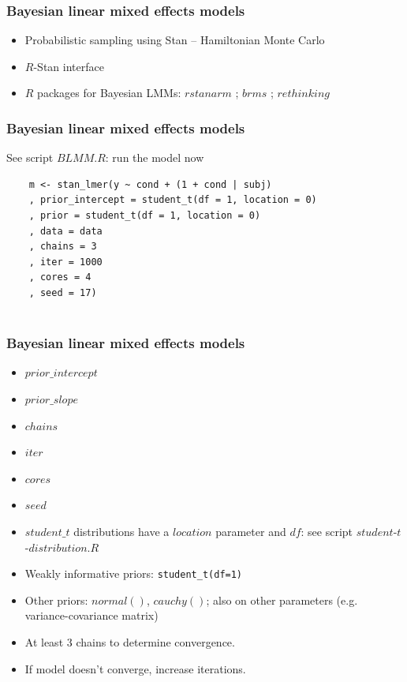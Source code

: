 \begin{frame}
	\frametitle{Bayesian linear mixed effects models}
	
	\begin{itemize}
		\item Probabilistic sampling using Stan -- Hamiltonian Monte Carlo
		\item $R$-Stan interface \cite{rstan2}
		\item $R$ packages for Bayesian LMMs: $rstanarm$ \cite{rstanarm}; $brms$ \cite{brms}; $rethinking$ \cite{mcelreath2016statistical}
	\end{itemize}
	
\end{frame}




\begin{frame}[fragile]
	\frametitle{Bayesian linear mixed effects models}

	See script $BLMM.R$: run the model now
	
	\begin{verbatim}
	m <- stan_lmer(y ~ cond + (1 + cond | subj)
	, prior_intercept = student_t(df = 1, location = 0) 
	, prior = student_t(df = 1, location = 0)
	, data = data
	, chains = 3
	, iter = 1000
	, cores = 4
	, seed = 17) 
		
	\end{verbatim}

\end{frame}


\begin{frame}
	\frametitle{Bayesian linear mixed effects models}

\begin{minipage}{3cm}
	\begin{itemize}
		\item $prior\_intercept$
		\item $prior\_slope$
		\item $chains$
		\item $iter$
		\item $cores$
		\item $seed$
	\end{itemize}
\end{minipage}
\hfill
\begin{minipage}{7.5cm}
	\begin{itemize}
		\item $student\_t$ distributions have a $location$ parameter and $df$: see script $student$-$t$-$distribution.R$
		\item Weakly informative priors: \texttt{student\_t(df=1)}		
		\item Other priors: $normal()$, $cauchy()$; also on other parameters (e.g. variance-covariance matrix)
		\item At least 3 chains to determine convergence.
		\item If model doesn't converge, increase iterations.
		\end{itemize}
\end{minipage}

	
\end{frame}


